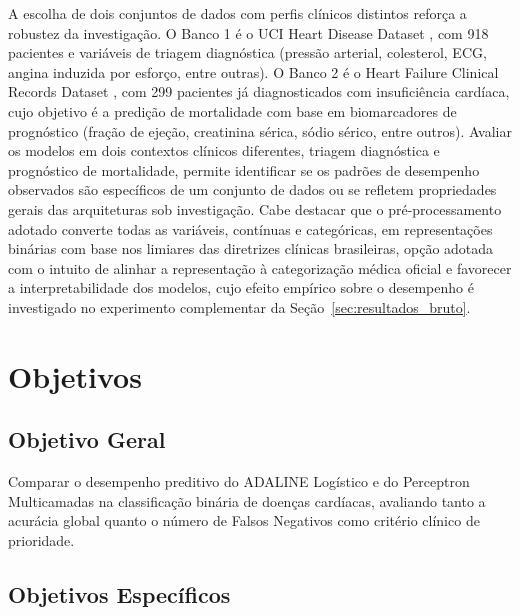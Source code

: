 A escolha de dois conjuntos de dados com perfis cl\'inicos distintos refor\c ca a robustez da investiga\c c\~ao. O Banco 1 \'e o UCI Heart Disease Dataset \cite{fedesoriano2021}, com 918 pacientes e vari\'aveis de triagem diagn\'ostica (press\~ao arterial, colesterol, ECG, angina induzida por esfor\c co, entre outras). O Banco 2 \'e o Heart Failure Clinical Records Dataset \cite{chicco2020}, com 299 pacientes j\'a diagnosticados com insufici\^encia card\'iaca, cujo objetivo \'e a predi\c c\~ao de mortalidade com base em biomarcadores de progn\'ostico (fra\c c\~ao de eje\c c\~ao, creatinina s\'erica, s\'odio s\'erico, entre outros). Avaliar os modelos em dois contextos cl\'inicos diferentes, triagem diagn\'ostica e progn\'ostico de mortalidade, permite identificar se os padr\~oes de desempenho observados s\~ao espec\'ificos de um conjunto de dados ou se refletem propriedades gerais das arquiteturas sob investiga\c c\~ao. Cabe destacar que o pr\'e-processamento adotado converte todas as vari\'aveis, cont\'inuas e categ\'oricas, em representa\c c\~oes bin\'arias com base nos limiares das diretrizes cl\'inicas brasileiras, op\c c\~ao adotada com o intuito de alinhar a representa\c c\~ao \`a categoriza\c c\~ao m\'edica oficial e favorecer a interpretabilidade dos modelos, cujo efeito emp\'irico sobre o desempenho \'e investigado no experimento complementar da Se\c c\~ao~\ref{sec:resultados_bruto}.

\section{Objetivos}

\subsection{Objetivo Geral}

Comparar o desempenho preditivo do ADALINE Log\'istico e do Perceptron Multicamadas na classifica\c c\~ao bin\'aria de doen\c cas card\'iacas, avaliando tanto a acur\'acia global quanto o n\'umero de Falsos Negativos como crit\'erio cl\'inico de prioridade.

\subsection{Objetivos Espec\'ificos}

